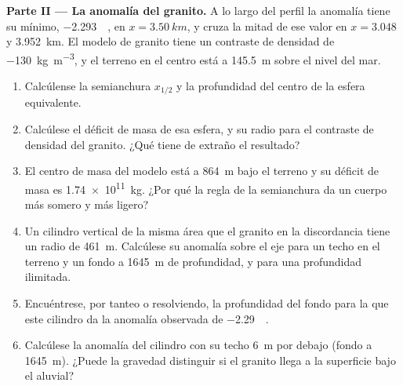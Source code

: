 \begin{problem}
\medskip\noindent\textbf{Parte II --- La anomalía del granito.} A lo largo
del perfil la anomalía tiene su mínimo, \qty{-2.293}{\milli\gal}, en
$x = \qty{3.50}{km}$, y cruza la mitad de ese valor en $x = 3.048$ y
\qty{3.952}{km}. El modelo de granito tiene un contraste de densidad de
\qty{-130}{kg.m^{-3}}, y el terreno en el centro está a \qty{145.5}{m}
sobre el nivel del mar.
\begin{enumerate}[resume]
\item Calcúlense la semianchura $x_{1/2}$ y la profundidad del centro de
  la esfera equivalente.
\item Calcúlese el déficit de masa de esa esfera, y su radio para el
  contraste de densidad del granito. ¿Qué tiene de extraño el resultado?
\item El centro de masa del modelo está a \qty{864}{m} bajo el terreno y su
  déficit de masa es \qty{1.74e11}{kg}. ¿Por qué la regla de la semianchura da un
  cuerpo más somero y más ligero?
\item Un cilindro vertical de la misma área que el granito en la
  discordancia tiene un radio de \qty{461}{m}. Calcúlese su anomalía sobre el eje
  para un techo en el terreno y un fondo a \qty{1645}{m} de profundidad, y para una
  profundidad ilimitada.
\item Encuéntrese, por tanteo o resolviendo, la profundidad del fondo para la que
  este cilindro da la anomalía observada de \qty{-2.29}{\milli\gal}.
\item Calcúlese la anomalía del cilindro con su techo \qty{6}{m} por debajo
  (fondo a \qty{1645}{m}). ¿Puede la gravedad distinguir si el granito llega a la
  superficie bajo el aluvial?
\end{enumerate}


\end{problem}
